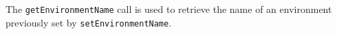 The \verb+getEnvironmentName+ call is used to retrieve the name of an environment previously set by \verb+setEnvironmentName+.
